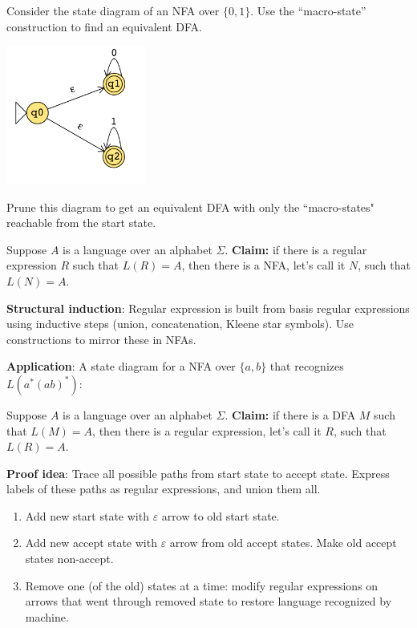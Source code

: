 \documentclass[12pt, oneside]{article}
\begin{document}
\vfill

\newpage
Consider the state diagram of an NFA over $\{0,1\}$. Use the ``macro-state'' construction 
to find an equivalent DFA.


\includegraphics[width=1.8in]{../../resources/machines/Lect6NFA2.png}

\vspace{50pt}

Prune this diagram to get an 
equivalent DFA 
with only the ``macro-states" reachable from the start state.

\vspace{150pt}

Suppose $A$ is a language over an alphabet $\Sigma$.
{\bf Claim:} if there is a regular expression $R$ such that $L(R) = A$, then there is a NFA, let's call it $N$, such that 
$L(N) = A$.

{\bf Structural induction}: Regular expression is built from basis regular expressions using inductive steps
(union, concatenation, Kleene star symbols). Use constructions to mirror these in NFAs.


{\bf Application}: A state diagram for a NFA over $\{a,b\}$ that recognizes $L(a^* (ab)^*)$:

\vfill

\newpage

Suppose $A$ is a language over an alphabet $\Sigma$.
{\bf Claim:} if there is a DFA $M$ such that $L(M) = A$, then there is a regular expression, let's call it $R$, such that 
$L(R) = A$.

{\bf Proof idea}: Trace all possible paths from start state to accept state.  Express labels of these paths
as regular expressions, and union them all.

\begin{enumerate}
\item Add new start state with $\varepsilon$ arrow to old start state.
\item Add new accept state with $\varepsilon$ arrow from old accept states.  Make old accept states
non-accept.
\item Remove one (of the old) states at a time: modify regular expressions on arrows that went through removed
state to restore language recognized by machine.
\end{enumerate}
\end{document}
